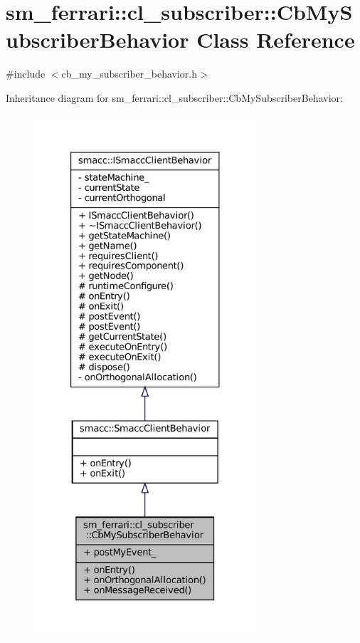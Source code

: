 \hypertarget{classsm__ferrari_1_1cl__subscriber_1_1CbMySubscriberBehavior}{}\section{sm\+\_\+ferrari\+:\+:cl\+\_\+subscriber\+:\+:Cb\+My\+Subscriber\+Behavior Class Reference}
\label{classsm__ferrari_1_1cl__subscriber_1_1CbMySubscriberBehavior}


{\ttfamily \#include $<$cb\+\_\+my\+\_\+subscriber\+\_\+behavior.\+h$>$}



Inheritance diagram for sm\+\_\+ferrari\+:\+:cl\+\_\+subscriber\+:\+:Cb\+My\+Subscriber\+Behavior\+:
\nopagebreak
\begin{figure}[H]
\begin{center}
\leavevmode
\includegraphics[height=550pt]{classsm__ferrari_1_1cl__subscriber_1_1CbMySubscriberBehavior__inherit__graph}
\end{center}
\end{figure}


